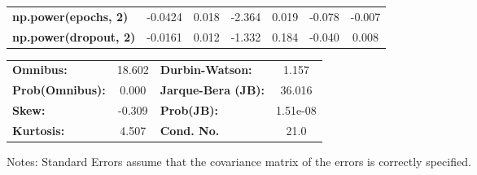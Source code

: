 \begin{center}
\begin{tabular}{lcccccc}
\textbf{np.power(epochs, 2)}         &      -0.0424  &        0.018     &    -2.364  &         0.019        &       -0.078    &       -0.007     \\
\textbf{np.power(dropout, 2)}        &      -0.0161  &        0.012     &    -1.332  &         0.184        &       -0.040    &        0.008     \\
\bottomrule
\end{tabular}
\begin{tabular}{lclc}
\textbf{Omnibus:}       & 18.602 & \textbf{  Durbin-Watson:     } &    1.157  \\
\textbf{Prob(Omnibus):} &  0.000 & \textbf{  Jarque-Bera (JB):  } &   36.016  \\
\textbf{Skew:}          & -0.309 & \textbf{  Prob(JB):          } & 1.51e-08  \\
\textbf{Kurtosis:}      &  4.507 & \textbf{  Cond. No.          } &     21.0  \\
\bottomrule
\end{tabular}
\end{center}

Notes: \newline
 [1] Standard Errors assume that the covariance matrix of the errors is correctly specified.